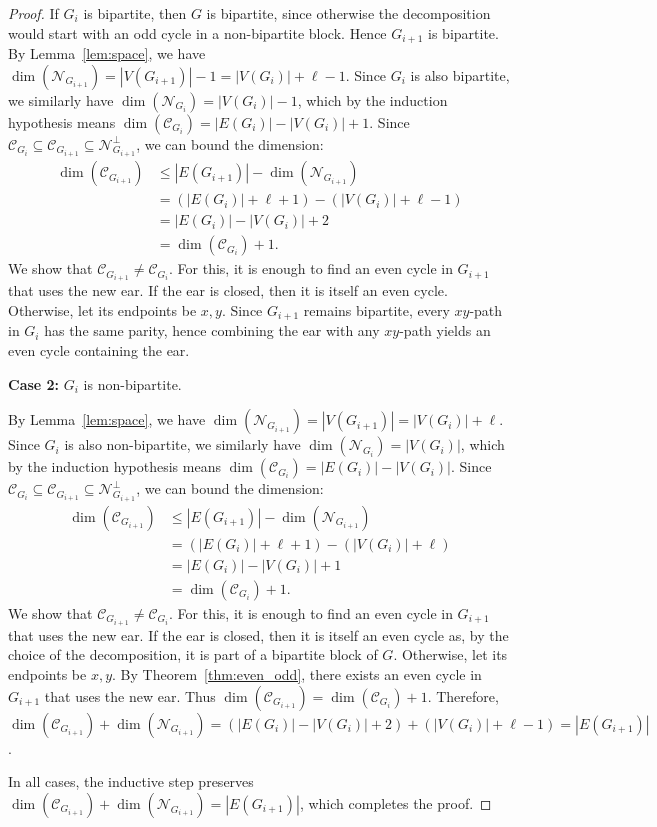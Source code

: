 \documentclass[10pt,a4paper]{amsart}
\newcommand{\cC}{\mathcal{C}}
\newcommand{\cN}{\mathcal{N}}
\begin{document}
\begin{proof}
    If $G_i$ is bipartite, then $G$ is bipartite, since otherwise the decomposition would start with an odd cycle in a non-bipartite block. Hence $G_{i+1}$ is bipartite. By Lemma~\ref{lem:space}, we have $\dim(\cN_{G_{i+1}}) = |V(G_{i+1})| - 1 = |V(G_i)| + \ell - 1$. Since $G_i$ is also bipartite, we similarly have $\dim(\cN_{G_i}) = |V(G_i)| - 1$, which by the induction hypothesis means $\dim(\cC_{G_i}) = |E(G_i)| - |V(G_i)| + 1$. Since $\cC_{G_i} \subseteq \cC_{G_{i+1}} \subseteq \cN_{G_{i+1}}^{\perp}$, we can bound the dimension:
    \begin{align*}
    \dim(\cC_{G_{i+1}}) 
    &\le |E(G_{i+1})| - \dim(\cN_{G_{i+1}})\\
    &= (|E(G_i)| + \ell + 1) - (|V(G_i)| + \ell - 1)\\
    &= |E(G_i)| - |V(G_i)| + 2\\
    &= \dim(\cC_{G_i}) + 1.
    \end{align*}
    We show that $\cC_{G_{i+1}} \neq \cC_{G_i}$. For this, it is enough to find an even cycle in $G_{i+1}$ that uses the new ear. If the ear is closed, then it is itself an even cycle. Otherwise, let its endpoints be $x,y$. Since $G_{i+1}$ remains bipartite, every $xy$-path in $G_i$ has the same parity, hence combining the ear with any $xy$-path yields an even cycle containing the ear.
    \medskip

    \noindent\textbf{Case 2:} $G_i$ is non-bipartite.

    By Lemma~\ref{lem:space}, we have $\dim(\cN_{G_{i+1}}) = |V(G_{i+1})| = |V(G_i)| + \ell$. Since $G_i$ is also non-bipartite, we similarly have $\dim(\cN_{G_i}) = |V(G_i)|$, which by the induction hypothesis means $\dim(\cC_{G_i}) = |E(G_i)| - |V(G_i)|$. Since $\cC_{G_i} \subseteq \cC_{G_{i+1}} \subseteq \cN_{G_{i+1}}^{\perp}$, we can bound the dimension:
    \begin{align*}
    \dim(\cC_{G_{i+1}}) 
    &\le |E(G_{i+1})| - \dim(\cN_{G_{i+1}})\\
    &= (|E(G_i)| + \ell + 1) - (|V(G_i)| + \ell)\\
    &= |E(G_i)| - |V(G_i)| + 1\\
    &= \dim(\cC_{G_i}) + 1.
    \end{align*}
    We show that $\cC_{G_{i+1}} \neq \cC_{G_i}$. For this, it is enough to find an even cycle in $G_{i+1}$ that uses the new ear. If the ear is closed, then it is itself an even cycle as, by the choice of the decomposition, it is part of a bipartite block of $G$. Otherwise, let its endpoints be $x,y$. By Theorem~\ref{thm:even_odd}, there exists an even cycle in $G_{i+1}$ that uses the new ear. Thus $\dim(\cC_{G_{i+1}}) = \dim(\cC_{G_i}) + 1$. Therefore, $\dim(\cC_{G_{i+1}}) + \dim(\cN_{G_{i+1}}) = (|E(G_i)| - |V(G_i)| + 2) + (|V(G_i)| + \ell - 1) = |E(G_{i+1})|$.
    \medskip
    
    In all cases, the inductive step preserves $\dim(\cC_{G_{i+1}}) + \dim(\cN_{G_{i+1}}) = |E(G_{i+1})|$, which completes the proof.
\end{proof}
\end{document}
